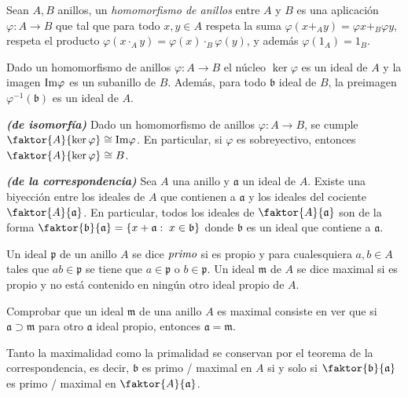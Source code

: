 \documentclass[./main.tex]{subfiles}
\begin{document}
\begin{definition} Sean $A,B$ anillos, un \emph{homomorfismo de anillos} entre $A$ y $B$ es una aplicación $\varphi:A\to B$ que tal que para todo $x,y\in A$ respeta la suma $\varphi(x+_Ay) = \varphi{x} +_B  \varphi{y}$, respeta el producto $\varphi(x\cdot_Ay) =  \varphi(x)\cdot_B\varphi(y)$, y además $\varphi(1_A) = 1_B$.
\end{definition}

Dado un homomorfismo de anillos $\varphi:A\to B$ el núcleo $\ker \varphi$ es un ideal de $A$ y la imagen $\text{Im} \varphi$ es un subanillo de $B$. Además, para todo $\mathfrak b$ ideal de $B$, la preimagen $\varphi^{-1}(\mathfrak b)$ es un ideal de $A$.

\begin{theorem} \textbf{\emph{(de isomorfía)}}
Dado un homomorfismo de anillos $\varphi:A\to B$, se cumple $\faktor{A}{\ker \varphi} \cong \im \varphi$. En particular, si $\varphi$ es sobreyectivo, entonces $\faktor{A}{\ker \varphi} \cong B$.
\end{theorem}

\begin{theorem} \textbf{\emph{(de la correspondencia)}}
Sea $A$ una anillo y $\mathfrak a$ un ideal de $A$. Existe una biyección entre los ideales de $A$ que contienen a $\mathfrak a$ y los ideales del cociente $\faktor{A}{\mathfrak a}$. En particular, todos los ideales de $\faktor{A}{\mathfrak a}$ son de la forma  $\faktor{\mathfrak b}{\mathfrak a} = \{ x + \mathfrak a:\; x \in \mathfrak b \}$ donde $\mathfrak b$ es un ideal que contiene a $\mathfrak a$.
\end{theorem}

\begin{definition}
Un ideal $\mathfrak p$ de un anillo $A$ se dice $\emph {primo}$ si es propio y para cualesquiera $a,b \in A$ tales que $ab \in \mathfrak p$ se tiene que $a\in \mathfrak p$ o $b \in  \mathfrak p$. Un ideal $\mathfrak m $ de $A$ se dice maximal si es propio y no está contenido en ningún otro ideal propio de $A$.
\end{definition}

Comprobar que un ideal $\mathfrak m$ de una anillo $A$ es maximal consiste en ver que si $\mathfrak a \supset \mathfrak m$ para otro $\mathfrak a$ ideal propio, entonces $\mathfrak a = \mathfrak m$.

Tanto la maximalidad como la primalidad se conservan por el teorema de la correspondencia, es decir, $\mathfrak b $ es primo / maximal en $A$ si y solo si $\faktor{\mathfrak b}{\mathfrak a}$ es primo / maximal en $\faktor{A}{\mathfrak a}$.
\end{document}

